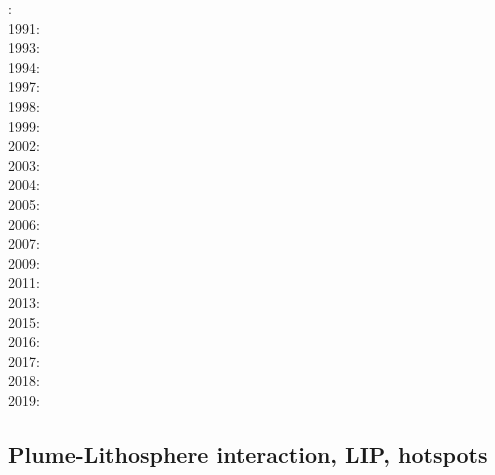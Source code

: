 {\scriptsize
{}: \cite{hovo77}\\
1991: \cite{kell91}\\
1993: \cite{keki93}\\
1994: \cite{nasf94}\cite{fari94}\cite{leka94b}\cite{hayu94}\\
1997: \cite{vank97}\cite{keki97}\cite{laym97}\\
1998: \cite{thta98}\cite{stoc98}\\
1999: \cite{lays99}\\
2002: \cite{falt02}\cite{dagl02}\cite{nitg02}\cite{tagh02}\\
2003: \cite{safa03}\\
2004: \cite{goch04}\cite{scmo04}\\
2005: \cite{tagu05}\cite{bung05}\cite{zhon05}\\
2006: \cite{isst06}\cite{liva06a}\cite{liva06b}\cite{zhon06}\cite{mita06}\cite{nokm06}\cite{qufo06}
      \cite{keso06}\\
2007: \cite{yumh07}\cite{ogaw07}\\
2009: \cite{vavl09}\cite{bogj09}\cite{faho09}\cite{scbs09b}\\
2011: \cite{toyu11}\cite{talz11}\cite{burk11}\cite{memm11}\cite{dalt11}\cite{tree11}\\
2013: \cite{dagm13}\cite{madd13}\cite{ande13}\cite{vadv13}\\
2015: \cite{daso15}\cite{hafg15}\\
2016: \cite{kili16}\\
2017: \cite{zhli17}\cite{moyu17}\cite{lizh17}\\
2018: \cite{dacc18}\cite{trev18}\\
2019: \cite{argc19}
}

\subsection{Plume-Lithosphere interaction, LIP, hotspots}


